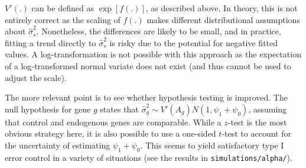 \documentclass{article}
\begin{document}
$V'(.)$ can be defined as $\exp[f(.)]$, as described above.
In theory, this is not entirely correct as the scaling of $f(.)$ makes different distributional assumptions about $\hat\sigma^2_s$.
Nonetheless, the differences are likely to be small, and in practice, fitting a trend directly to $\hat\sigma^2_s$ is risky due to the potential for negative fitted values.
A log-transformation is not possible with this approach as the expectation of a log-transformed normal variate does not exist (and thus cannot be used to adjust the scale).

The more relevant point is to see whether hypothesis testing is improved.
The null hypothesis for gene $g$ states that $\hat\sigma^2_g  \sim V'(A_g)N(1, \psi_1 + \psi_0)$, assuming that control and endogenous genes are comparable.
While a $z$-test is the most obvious strategy here, it is also possible to use a one-sided $t$-test to account for the uncertainty of estimating $\psi_1 + \psi_0$.
This seems to yield satisfactory type I error control in a variety of situations (see the results in \texttt{simulations/alpha/}).




\end{document}
